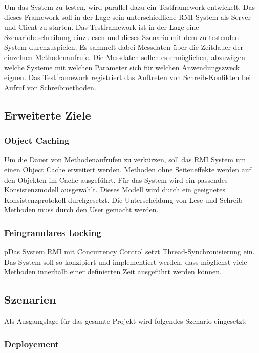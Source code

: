 \documentclass{article}
\begin{document}
Um das System zu testen, wird parallel dazu ein Testframework entwickelt. Das dieses Framework soll in der Lage sein unterschiedliche RMI System als Server und Client zu starten. Das Testframework ist in der Lage eine Szenariobeschreibung einzulesen und dieses Szenario mit dem zu testenden System durchzuspielen. Es sammelt dabei Messdaten über die Zeitdauer der einzelnen Methodenaufrufe. Die Messdaten sollen es ermöglichen, abzuwägen welche Systeme mit welchen Parameter sich für welchen Anwendungszweck eignen.
Das Testframework registriert das Auftreten von Schreib-Konfikten bei Aufruf von Schreibmethoden.

\subsection{Erweiterte Ziele}
\label{sec:erweiterte-ziele}

\subsubsection{Object Caching}
\label{sec:object-caching}

Um die Dauer von Methodenaufrufen zu verkürzen, soll das RMI System um einen Object Cache erweitert werden. Methoden ohne Seiteneffekte werden auf den Objekten im Cache ausgeführt. Für das System wird ein passendes Konsistenzmodell ausgewählt. Dieses Modell wird durch ein geeignetes Konsistenzprotokoll durchgesetzt. Die Unterscheidung von Lese und Schreib- Methoden muss durch den User gemacht werden.

\subsubsection{Feingranulares Locking}
\label{sec:feingr-lock}

pDas System RMI mit Concurrency Control setzt Thread-Synchronisierung ein. Das System soll so konzipiert und implementiert werden, dass möglichst viele Methoden innerhalb einer definierten Zeit ausgeführt werden können.

\subsection{Szenarien}
\label{sec:szenario}

Als Ausgangslage für das gesamte Projekt wird folgendes Szenario eingesetzt:

\subsubsection{Deployement}
\label{sec:deployement}
\end{document}
